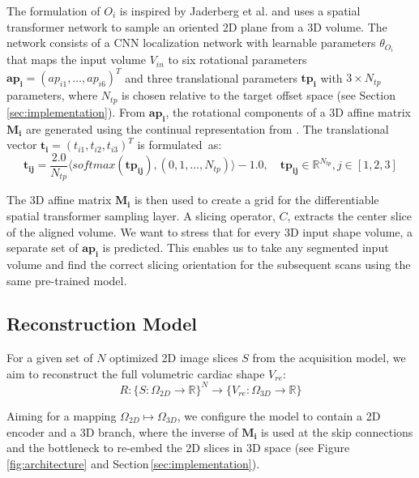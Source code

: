     The formulation of $O_i$ is inspired by Jaderberg et al. \cite{jaderberg2015spatial} and uses a spatial transformer network to sample an oriented 2D plane from a 3D volume.
    The network consists of a CNN localization network with learnable parameters $\theta_{O_i}$ that maps the input volume $V_{in}$ to six rotational parameters $\mathbf{ap_i}=\left(ap_{i1}, \dots, ap_{i6}\right)^T$ and three translational parameters  $\mathbf{tp_i}$ with $3 \times N_{tp}$ parameters, where $N_{tp}$ is chosen relative to the target offset space (see Section\,\ref{sec:implementation}). From $\mathbf{ap_i}$, the rotational components of a 3D affine matrix $\mathbf{M_i}$ are generated using the continual representation from \cite{zhou2019continuity}. The translational vector $\mathbf{t_i}=\left(t_{i1}, t_{i2}, t_{i3}\right)^T$ is formulated~as:
    \begin{equation}
        \mathbf{t_{ij}} = \frac{2.0}{N_{tp}}\langle softmax\left(\mathbf{tp_{ij}}\right), \left(0,1,\dots,N_{tp}\right)\rangle -1.0, \quad \mathbf{tp_{ij}} \in \mathbb{R}^{N_{tp}}\label{eq:translation}, j \in \left[1,2,3\right]
    \end{equation}

    The 3D affine matrix $\mathbf{M_i}$ is then used to create a grid for the differentiable spatial transformer sampling layer. A slicing operator, $C$, extracts the center slice of the aligned volume. We want to stress that for every 3D input shape volume, a separate set of $\mathbf{ap_i}$ is predicted. This enables us to take any segmented input volume and find the correct slicing orientation for the subsequent scans using the same pre-trained model.  %

    \subsection{Reconstruction Model}
    \label{sec:method_reconstruction_model}
     For a given set of $N$ optimized 2D image slices $S$ from the acquisition model, we aim to reconstruct the full volumetric cardiac shape $V_{re}$:
    \begin{equation}
        R: \{ S:\Omega_{2D} \rightarrow \mathbb{R}\}^N \rightarrow \{V_{re}:\Omega_{3D} \rightarrow \mathbb{R}\} \label{eq:reconstruction}
    \end{equation}

    Aiming for a mapping $\Omega_{2D} \mapsto \Omega_{3D}$, we configure the model to contain a 2D encoder and a 3D branch, where the inverse of $\mathbf{M_i}$ is used at the skip connections and the bottleneck to re-embed the 2D slices in 3D space (see Figure\,\ref{fig:architecture} and Section\,\ref{sec:implementation}).

